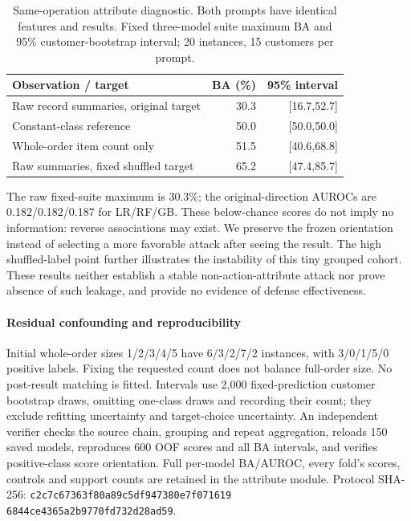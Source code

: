 \begin{table}[ht]\centering\footnotesize
\caption{Same-operation attribute diagnostic. Both prompts have identical features and results. Fixed three-model suite maximum BA and 95\% customer-bootstrap interval; 20 instances, 15 customers per prompt.}\label{tab:r8-attribute}
\begin{tabular}{@{}lrr@{}}\toprule
Observation / target & BA (\%) & 95\% interval\\\midrule
Raw record summaries, original target & 30.3 & [16.7,52.7]\\
Constant-class reference & 50.0 & [50.0,50.0]\\
Whole-order item count only & 51.5 & [40.6,68.8]\\
Raw summaries, fixed shuffled target & 65.2 & [47.4,85.7]\\\bottomrule
\end{tabular}\end{table}

The raw fixed-suite maximum is 30.3\%; the original-direction AUROCs are 0.182/0.182/0.187 for LR/RF/GB. These below-chance scores do not imply no information: reverse associations may exist. We preserve the frozen orientation instead of selecting a more favorable attack after seeing the result. The high shuffled-label point further illustrates the instability of this tiny grouped cohort. These results neither establish a stable non-action-attribute attack nor prove absence of such leakage, and provide no evidence of defense effectiveness.

\paragraph{Residual confounding and reproducibility}
Initial whole-order sizes 1/2/3/4/5 have 6/3/2/7/2 instances, with 3/0/1/5/0 positive labels. Fixing the requested count does not balance full-order size. No post-result matching is fitted. Intervals use 2,000 fixed-prediction customer bootstrap draws, omitting one-class draws and recording their count; they exclude refitting uncertainty and target-choice uncertainty. An independent verifier checks the source chain, grouping and repeat aggregation, reloads 150 saved models, reproduces 600 OOF scores and all BA intervals, and verifies positive-class score orientation. Full per-model BA/AUROC, every fold's scores, controls and support counts are retained in the attribute module. Protocol SHA-256: \texttt{c2c7c67363f80a89c5df947380e7f071619}\\\texttt{6844ce4365a2b9770fd732d28ad59}.
